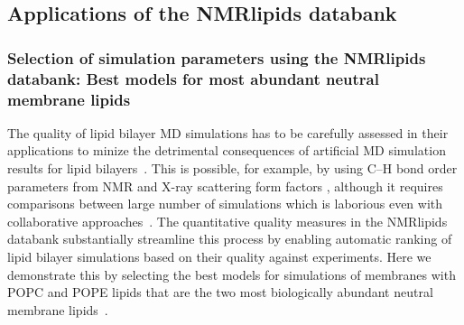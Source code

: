 \documentclass[fleqn,10pt]{wlscirep}
\begin{document}
\subsection{Applications of the NMRlipids databank}
\subsubsection{Selection of simulation parameters using the NMRlipids databank: Best models for most abundant neutral membrane lipids}
%
%
%
The quality of lipid bilayer MD simulations has to be carefully assessed in their applications to minize the detrimental consequences of artificial MD simulation results for lipid bilayers~\cite{antila22b}. This is possible, for example, by using C--H bond order parameters from NMR and X-ray scattering form factors \cite{ollila16}, although it requires comparisons between large number of simulations which is laborious even with collaborative approaches~\cite{botan15,catte16,antila19,bacle21}. The quantitative quality measures in the NMRlipids databank substantially streamline this process by enabling automatic ranking of lipid bilayer simulations based on their quality against experiments. Here we demonstrate this by selecting the best models for simulations of membranes with POPC and POPE lipids that are the two most biologically abundant neutral membrane lipids~\cite{vanmeer08}.
\end{document}
